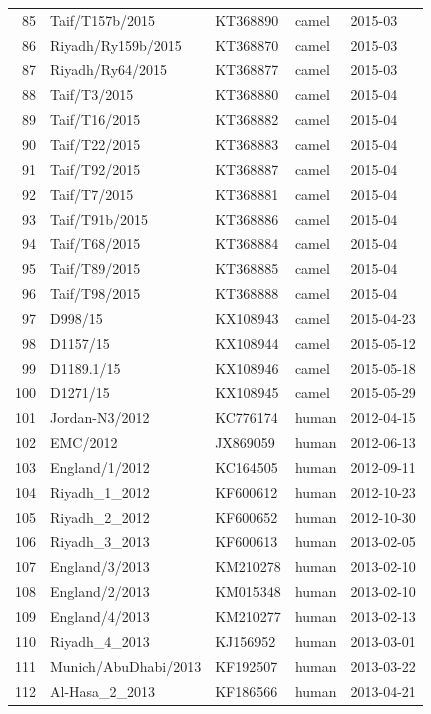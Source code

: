 \documentclass[11pt,oneside,letterpaper]{article}
\begin{document}
\begin{longtable}{ | r | l | p{2cm} | l | l | }
  85 & Taif/T157b/2015 & KT368890 & camel & 2015-03 \\
  86 & Riyadh/Ry159b/2015 & KT368870 & camel & 2015-03 \\
  87 & Riyadh/Ry64/2015 & KT368877 & camel & 2015-03 \\
  88 & Taif/T3/2015 & KT368880 & camel & 2015-04 \\
  89 & Taif/T16/2015 & KT368882 & camel & 2015-04 \\
  90 & Taif/T22/2015 & KT368883 & camel & 2015-04 \\
  91 & Taif/T92/2015 & KT368887 & camel & 2015-04 \\
  92 & Taif/T7/2015 & KT368881 & camel & 2015-04 \\
  93 & Taif/T91b/2015 & KT368886 & camel & 2015-04 \\
  94 & Taif/T68/2015 & KT368884 & camel & 2015-04 \\
  95 & Taif/T89/2015 & KT368885 & camel & 2015-04 \\
  96 & Taif/T98/2015 & KT368888 & camel & 2015-04 \\
  97 & D998/15 & KX108943 & camel & 2015-04-23 \\
  98 & D1157/15 & KX108944 & camel & 2015-05-12 \\
  99 & D1189.1/15 & KX108946 & camel & 2015-05-18 \\
  100 & D1271/15 & KX108945 & camel & 2015-05-29 \\
  101 & Jordan-N3/2012 & KC776174 & human & 2012-04-15 \\
  102 & EMC/2012 & JX869059 & human & 2012-06-13 \\
  103 & England/1/2012 & KC164505 & human & 2012-09-11 \\
  104 & Riyadh\_1\_2012 & KF600612 & human & 2012-10-23 \\
  105 & Riyadh\_2\_2012 & KF600652 & human & 2012-10-30 \\
  106 & Riyadh\_3\_2013 & KF600613 & human & 2013-02-05 \\
  107 & England/3/2013 & KM210278 & human & 2013-02-10 \\
  108 & England/2/2013 & KM015348 & human & 2013-02-10 \\
  109 & England/4/2013 & KM210277 & human & 2013-02-13 \\
  110 & Riyadh\_4\_2013 & KJ156952 & human & 2013-03-01 \\
  111 & Munich/AbuDhabi/2013 & KF192507 & human & 2013-03-22 \\
  112 & Al-Hasa\_2\_2013 & KF186566 & human & 2013-04-21 \\

\end{longtable}
\end{document}
